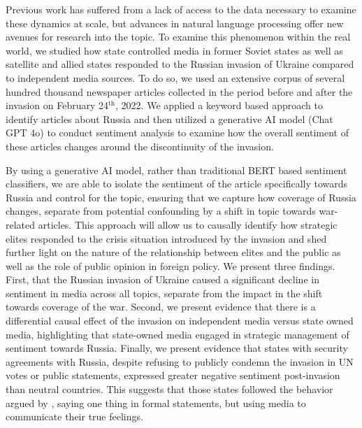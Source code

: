\documentclass[12pt]{article}
\begin{document}
Previous work has suffered from a lack of access to the data necessary to examine these dynamics at scale, but advances in natural language processing offer new avenues for research into the topic. To examine this phenomenon within the real world, we studied how state controlled media in former Soviet states as well as satellite and allied states responded to the Russian invasion of Ukraine compared to independent media sources. To do so, we used an extensive corpus of several hundred thousand newspaper articles collected in the period before and after the invasion on February 24$^{\text{th}}$, 2022. We applied a keyword based approach to identify articles about Russia and then utilized a generative AI model (Chat GPT 4o) to conduct sentiment analysis to examine how the overall sentiment of these articles changes around the discontinuity of the invasion. 

By using a generative AI model, rather than traditional BERT based sentiment classifiers, we are able to isolate the sentiment of the article specifically towards Russia and control for the topic, ensuring that we capture how coverage of Russia changes, separate from potential confounding by a shift in topic towards war-related articles. This approach will allow us to causally identify how strategic elites responded to the crisis situation introduced by the invasion and shed further light on the nature of the relationship between elites and the public as well as the role of public opinion in foreign policy. We present three findings. First, that the Russian invasion of Ukraine caused a significant decline in sentiment in media across all topics, separate from the impact in the shift towards coverage of the war. Second,  we present evidence that there is a differential causal effect of the invasion on independent media versus state owned media, highlighting that state-owned media engaged in strategic management of sentiment towards Russia. Finally, we present evidence that states with security agreements with Russia, despite refusing to publicly condemn the invasion in UN votes or public statements, expressed greater negative sentiment post-invasion than neutral countries. This suggests that those states followed the behavior argued by \citet{cohen_theatre_1987}, saying one thing in formal statements, but using media to communicate their true feelings.
\end{document}
